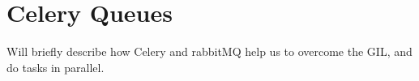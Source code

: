 \section{Celery Queues}
\label{exp:Celery}
Will briefly describe how Celery and rabbitMQ help us to overcome the GIL, and do tasks in parallel.